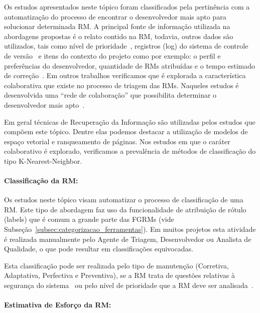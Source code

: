 Os estudos apresentados neste tópico foram classificados pela pertinência com a
automatização do processo de encontrar o desenvolvedor mais apto para solucionar
determinada RM\@. A principal fonte de informação utilizada na abordagens
propostas é o relato contido na RM, todavia, outros dados são utilizados, tais
como nível de prioridade~\cite{tian2015automated}, registros (log) do sistema de
controle de versão~\cite{shokripour2012automatic, Hu:2014:EBT:2707683.2708297} e
itens do contexto do projeto como por exemplo: o perfil e preferências do
desenvolvedor, quantidade de RMs atribuídas e o tempo estimado de
correção~\cite{hosseini2012market}. Em outros trabalhos verificamos que é
explorada a característica colaborativa que existe no processo de triagem das
RMs. Naqueles estudos é desenvolvida uma ``rede de colaboração'' que possibilita
determinar o desenvolvedor mais apto~\cite{Zhang2014,Zanetti2013, Wu2011}.

Em geral técnicas de Recuperação da Informação são utilizadas pelos estudos que
compõem este tópico. Dentre elas podemos destacar a utilização de modelos de
espaço vetorial e ranqueamento de páginas. Nos estudos em que o caráter
colaborativo é explorado, verificamos a prevalência de métodos de classificação
do tipo K-Nearest-Neighbor.

\paragraph{Classificação da RM:}

Os estudos neste tópico visam automatizar o processo de clas\-si\-fi\-ca\-ção de
uma RM\@.  Este tipo de abordagem faz uso da funcionalidade de atribuição de
rótulo (labels) que é comum  a grande parte das FGRMs (vide
Subseção~\ref{subsec:categorizacao_ferramentas}). Em muitos projetos esta
atividade é realizada manualmente pelo Agente de Triagem, Desenvolvedor ou
Analista de Qualidade, o que pode resultar em classificações equivocadas.

Esta classificação pode ser realizada pelo tipo de manutenção (Corretiva,
Adaptativa, Perfectiva e Preventiva), se a RM trata de questões relativas à
segurança do sistema~\cite{gegick2010identifying, behl2014bug} ou pelo nível de
prioridade que a RM deve ser analisada~\cite{behl2014bug}.

\paragraph{Estimativa de Esforço da RM:}

